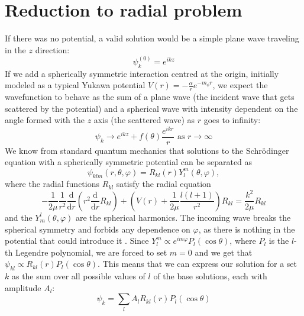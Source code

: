 \section{Reduction to radial problem}

If there was no potential, a valid solution would be a simple plane wave traveling in the \(z\) direction:
\begin{equation}
	\psi _k^{(0)} = e^{ikz} 
\end{equation}
If we add a spherically symmetric interaction centred at the origin, initially modeled as a typical Yukawa potential \(V(r) =- \frac{\alpha}{r} e^{-m_{\phi } r }\), we expect the wavefunction to behave as the sum of a plane wave (the incident wave that gets scattered by the potential) and a spherical wave with intensity dependent on the angle formed with the \(z\) axis (the scattered wave) as \(r\) goes to infinity:
\begin{equation}\label{deriv:asymptotic}
	\psi _k \to e^{ikz} + f(\theta ) \frac{e^{ikr} }{r} \text{ as } r\to \infty 
\end{equation}
We know from standard quantum mechanics that solutions to the Schrödinger equation with a spherically symmetric potential can be separated as
\begin{equation}
	\psi_{klm} (r,\theta,\varphi) = R_{kl} (r) Y_l^m(\theta , \varphi ),
\end{equation}
where the radial functions \(R_{kl} \) satisfy the radial equation
\begin{equation}\label{deriv:radial}
	-\frac{1}{2\mu } \frac{1}{r^2} \frac{\mathrm{d}}{\mathrm{d}r}\left(r^2 \frac{\mathrm{d}}{\mathrm{d}r}  R_{kl}\right) + \left(V(r)+ \frac{1}{2\mu }\frac{l(l+1)}{r^2}\right)R_{kl} = \frac{k^2}{2\mu }R_{kl} 
\end{equation}
and the \(Y_m^l(\theta , \varphi )\) are the spherical harmonics. The incoming wave breaks the spherical symmetry and forbids any dependence on \(\varphi \), as there is nothing in the potential that could introduce it \cite{Griffiths}. Since \(Y_l^m \propto e^{im \varphi} P_l(\cos \theta ) \), where \(P_l\) is the \(l\)-th Legendre polynomial, we are forced to set \(m=0\) and we get that \(\psi_{kl} \propto R_{kl}(r) P_l (\cos \theta )\). This means that we can express our solution for a set \(k\) as the sum over all possible values of \(l\) of the base solutions, each with amplitude \(A_l\):
\begin{equation}\label{deriv:sum}
	\psi _k = \sum_{l} A_l R_{kl} (r) P_l (\cos \theta )
\end{equation}

